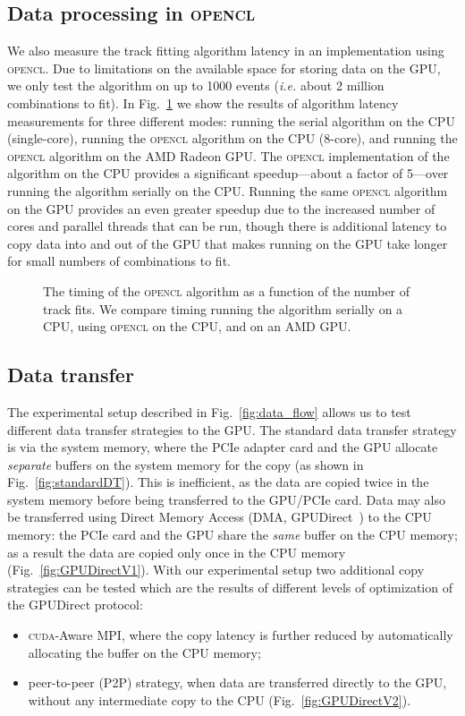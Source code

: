 \documentclass[journal]{IEEEtran}
\begin{document}
\subsection{Data processing in \textsc{opencl}}
We also measure the track fitting algorithm latency in an implementation  
using \textsc{opencl}. Due to limitations on the available space for storing data on the GPU, we only test the 
algorithm on up to 1000 events (\textit{i.e.} about 2 million combinations to fit). In Fig.~\ref{fig:opencl_timing} 
we show the results of algorithm latency measurements for three different modes: running the serial algorithm  
on the CPU (single-core), running the \textsc{opencl} algorithm on the CPU (8-core), and running the \textsc{opencl} algorithm
on the AMD Radeon GPU. The \textsc{opencl} implementation of the algorithm on the CPU provides a significant speedup---about 
a factor of 5---over running the algorithm serially on the CPU. Running the same \textsc{opencl} algorithm on the GPU provides an 
even greater speedup due to the increased number of cores and parallel threads that can be run, though there is additional latency to copy data 
into and out of the GPU that makes running on the GPU take longer for small numbers of combinations to fit.
\begin{figure}[!t]
  \centering
  \caption{The timing of the \textsc{opencl} algorithm as a function of the
    number of track fits. We compare timing running the algorithm serially on a CPU, 
    using \textsc{opencl} on the CPU, and on an AMD GPU.}
  \label{fig:opencl_timing}
\end{figure}

\subsection{Data transfer}
The experimental setup described in Fig.~\ref{fig:data_flow} allows us to 
test different data transfer  strategies to the GPU. The standard data transfer 
strategy is via the system memory, where the 
PCIe adapter card and the GPU allocate \emph{separate} buffers on the
system memory for the copy (as shown in Fig.~\ref{fig:standardDT}).
This is inefficient, as the data are copied twice in the 
system memory before being transferred to the GPU/PCIe card. 
Data may also be transferred using Direct Memory Access (DMA, 
GPUDirect~\cite{bib_GPUDirect}) to the CPU memory:
the PCIe card and the GPU share the \textit{same} buffer on the CPU memory; as 
a result the data are copied only once in the CPU memory 
(Fig.~\ref{fig:GPUDirectV1}). 
With our experimental setup two additional copy strategies can be tested
which are the results of different levels of 
optimization of the GPUDirect protocol:
\begin{itemize}
\item \textsc{cuda}-Aware MPI, where the copy latency is further reduced
by automatically allocating the buffer on the CPU memory;
\item peer-to-peer (P2P) strategy, when data are transferred 
directly to the GPU, without any  
intermediate copy to the CPU (Fig.~\ref{fig:GPUDirectV2}).
\end{itemize}
\end{document}

